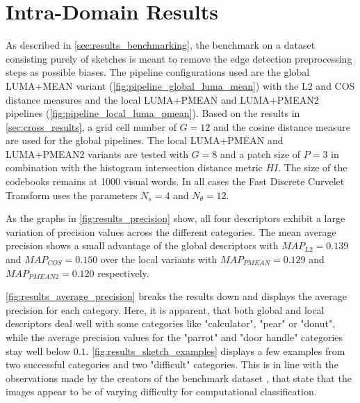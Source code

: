 \section{Intra-Domain Results}\label{sec:intra_results}

As described in \autoref{sec:results_benchmarking}, the benchmark on a dataset
consisting purely of sketches is meant to remove the edge detection
preprocessing steps as possible biases. The pipeline configurations used are
the global LUMA+MEAN variant (\autoref{fig:pipeline_global_luma_mean}) with the
L2 and COS distance measures and the local LUMA+PMEAN and LUMA+PMEAN2
pipelines (\autoref{fig:pipeline_local_luma_pmean}). Based on the results in
\autoref{sec:cross_results}, a grid cell number of $G=12$ and the cosine
distance measure are used for the global pipelines. The local LUMA+PMEAN and
LUMA+PMEAN2 variants are tested with $G=8$ and a patch size of $P=3$ in
combination with the histogram intersection distance metric $HI$. The size of
the codebooks remains at 1000 visual words. In all cases the Fast Discrete
Curvelet Transform uses the parameters $N_s=4$ and $N_{\theta}=12$.

As the graphs in \autoref{fig:results_precision} show, all four descriptors
exhibit a large variation of precision values across the different categories.
The mean average precision shows a small advantage of the global descriptors
with $MAP_{L2}=0.139$ and $MAP_{COS}=0.150$ over the local variants with
$MAP_{PMEAN}=0.129$ and $MAP_{PMEAN2}=0.120$ respectively.

\autoref{fig:results_average_precision} breaks the results down and displays
the average precision for each category. Here, it is apparent, that both global
and local descriptors deal well with some categories like "calculator", "pear"
or "donut", while the average precision values for the "parrot" and "door
handle" categories stay well below $0.1$. \autoref{fig:results_sketch_examples}
displays a few examples from two successful categories and two "difficult"
categories. This is in line with the observations made by the creators of the
benchmark dataset \autocite{eitz_how_2012}, that state that the images appear
to be of varying difficulty for computational classification. 

